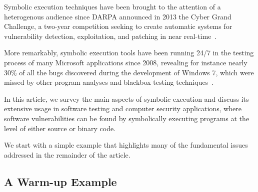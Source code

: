 
Symbolic execution techniques have been brought to the attention of a heterogenous audience since DARPA announced in 2013 the Cyber Grand Challenge, a two-year competition seeking to create automatic systems for vulnerability detection, exploitation, and patching in near real-time~\cite{ANGR-SSP16}.

More remarkably, symbolic execution tools have been running 24/7 in the testing process of many Microsoft applications since 2008, revealing for instance nearly 30\% of all the bugs discovered during the development of Windows 7, which were missed by other program analyses and blackbox testing techniques~\cite{SAGE-QUEUE12}.

In this article, we survey the main aspects of symbolic execution and discuss its extensive usage in software testing and computer security applications, where software vulnerabilities can be found by symbolically executing programs at the level of either source or binary code.  

We start with a simple example that highlights many of the fundamental issues addressed in the remainder of the article.

\subsection{A Warm-up Example}
\label{symbolic-execution-example}

